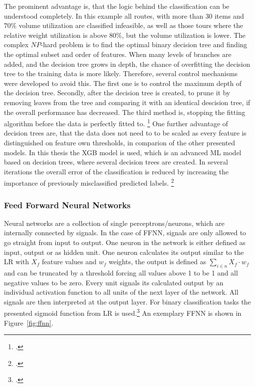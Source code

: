 
The  prominent advantage is, that the logic behind the classification can be understood
completely. In this example all routes, with more than 30 items and $70\%$ volume utilization are classified infeasible,
as well as those tours where the relative weight utilization is above $80\%$, but the volume utilization is lower. The complex
$NP$-hard problem is to find the optimal binary decision tree and finding the optimal subset and order of
features.
When many levels of branches are added, and the decision tree grows in depth, the chance of
overfitting the decision tree to the training data is more likely. Therefore, several control mechanisms
were developed to avoid this. The first one is to control the maximum depth
of the decision tree. Secondly, after the decision tree is created, to prune it by removing leaves from
the tree and comparing it with an identical descision tree, if the overall performance has decreased.
The third method is, stopping the fitting algorithm before the data is perfectly fitted to. \footcite[cf.][p. 252]{kotsiantis_supervised_2007}
One further advantage of decision trees are, that the data does not need to to be scaled as every feature is
distinguished on feature own thresholds, in comparion of the other presented models. In this thesis the \gls{XGB} model is used,
which is an advanced \gls{ML} model based on decision trees, where several decision trees are created. In several iterations
the overall error of the classification is reduced by increasing the importance of previously misclassified predicted labels. \footcite[cf.][]{noauthor_introduction_2025}

\subsubsection{Feed Forward Neural Networks}

Neural networks are a collection of single perceptrons/neurons, which are internally connected by
signals. In the case of \gls{FFNN}, signals are only allowed to go straight from input to output. One neuron
in the network is either defined as input, output or as hidden unit. One neuron calculates its
output similar to the \gls{LR} with $X_f$ feature values and $w_f$ weights, the output is defined
as $\textstyle\sum_{i \in n} X_f\cdot w_f$ and can be truncated by a threshold forcing all values above 1
to be 1 and all negative values to be zero. Every unit signals its calculated output by an individual
activation function to all units of the next layer of the network. All signals are
then interpreted at the output layer. For binary classification tasks the presented sigmoid function from \gls{LR} is used.\footcite[cf.][p. 255]{kotsiantis_supervised_2007}
An exemplary \gls{FFNN} is shown in Figure~\ref{fig:ffnn}.

